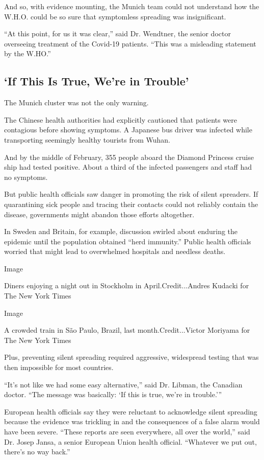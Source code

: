 And so, with evidence mounting, the Munich team could not understand how
the W.H.O. could be so sure that symptomless spreading was
insignificant.

``At this point, for us it was clear,'' said Dr. Wendtner, the senior
doctor overseeing treatment of the Covid-19 patients. ``This was a
misleading statement by the W.HO.''

\hypertarget{if-this-is-true-were-in-trouble}{%
\subsection{`If This Is True, We're in
Trouble'}\label{if-this-is-true-were-in-trouble}}

The Munich cluster was not the only warning.

The Chinese health authorities had explicitly cautioned that patients
were contagious before showing symptoms. A Japanese bus driver was
infected while transporting seemingly healthy tourists from Wuhan.

And by the middle of February, 355 people aboard the Diamond Princess
cruise ship had tested positive. About a third of the infected
passengers and staff had no symptoms.

But public health officials saw danger in promoting the risk of silent
spreaders. If quarantining sick people and tracing their contacts could
not reliably contain the disease, governments might abandon those
efforts altogether.

In Sweden and Britain, for example, discussion swirled about enduring
the epidemic until the population obtained ``herd immunity.'' Public
health officials worried that might lead to overwhelmed hospitals and
needless deaths.

Image

Diners enjoying a night out in Stockholm in April.Credit...Andres
Kudacki for The New York Times

Image

A crowded train in São Paulo, Brazil, last month.Credit...Victor
Moriyama for The New York Times

Plus, preventing silent spreading required aggressive, widespread
testing that was then impossible for most countries.

``It's not like we had some easy alternative,'' said Dr. Libman, the
Canadian doctor. ``The message was basically: `If this is true, we're in
trouble.'''

European health officials say they were reluctant to acknowledge silent
spreading because the evidence was trickling in and the consequences of
a false alarm would have been severe. ``These reports are seen
everywhere, all over the world,'' said Dr. Josep Jansa, a senior
European Union health official. ``Whatever we put out, there's no way
back.''

